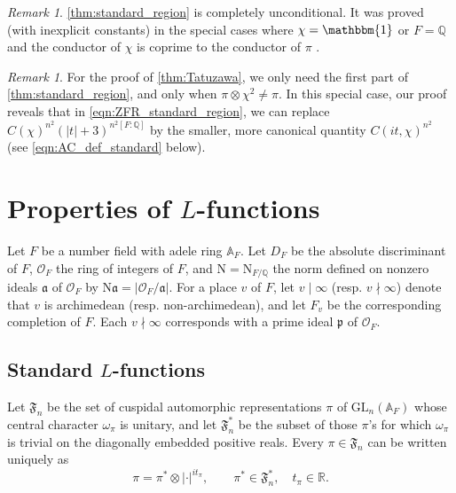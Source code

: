 \documentclass[12pt]{amsart}
\theoremstyle{definition}
\theoremstyle{remark}
\newtheorem{remark}[theorem]{Remark}
\numberwithin{equation}{section}
\theoremstyle{plain}
\newcommand{\GL}{\mathrm{GL}}
\newcommand{\N}{\mathrm{N}}
\newcommand{\A}{\mathbb{A}}
\newcommand{\Q}{\mathbb{Q}}
\newcommand{\R}{\mathbb{R}}
\newcommand{\ka}{\mathfrak{a}}
\newcommand{\kp}{\mathfrak{p}}
\newcommand{\cO}{\mathcal{O}}
\begin{document}
\begin{remark}
\cref{thm:standard_region} is completely unconditional.  It was proved (with inexplicit constants) in the special cases where $\chi=\mathbbm{1}$ \cite[Theorem~1.1]{HumphriesThorner} or $F=\Q$ and the conductor of $\chi$ is coprime to the conductor of $\pi$ \cite[Theorem~8.2]{HumphriesThorner2}.
\end{remark}

\begin{remark}
\label{conductorremark}
For the proof of \cref{thm:Tatuzawa}, we only need the first part of \cref{thm:standard_region}, and only when $\pi\otimes\chi^2\neq\pi$.  In this special case, our proof reveals that in \eqref{eqn:ZFR_standard_region}, we can replace $C(\chi)^{n^2}(|t|+3)^{n^2[F:\Q]}$ by the smaller, more canonical quantity $C(it,\chi)^{n^2}$ (see \eqref{eqn:AC_def_standard} below).
\end{remark}

\section{Properties of $L$-functions}

Let $F$ be a number field with adele ring $\A_F$. Let $D_F$ be the absolute discriminant of $F$, $\cO_F$ the ring of integers of $F$, and $\N=\N_{F/\Q}$ the norm defined on nonzero ideals $\ka$ of $\cO_F$ by $\N\ka=|\cO_F/\ka|$. For a place $v$ of $F$, let $v\mid\infty$ (resp. $v\nmid\infty$) denote that $v$ is archimedean (resp. non-archimedean), and let $F_v$ be the corresponding completion of $F$. Each $v\nmid\infty$ corresponds with a prime ideal $\kp$ of $\cO_F$.

\subsection{Standard $L$-functions}

Let $\mathfrak{F}_n$ be the set of cuspidal automorphic representations $\pi$ of $\GL_n(\A_F)$ whose central character $\omega_\pi$ is unitary, and let $\mathfrak{F}_n^*$ be the subset of those $\pi$'s for which $\omega_\pi$ is trivial on the diagonally embedded positive reals. Every $\pi\in\mathfrak{F}_n$ can be written uniquely as
\begin{equation}
\label{eqn:pidecomp}
\pi=\pi^*\otimes|\cdot|^{it_{\pi}},\qquad \pi^*\in\mathfrak{F}_n^*,\quad t_{\pi}\in\R.
\end{equation}
\end{document}
